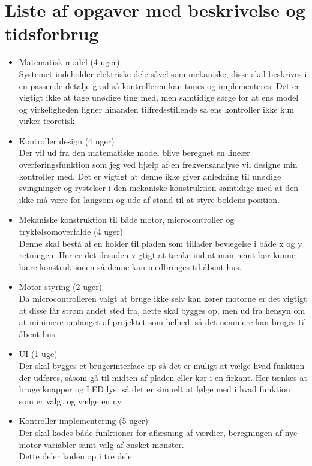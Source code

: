 \section{Liste af opgaver med beskrivelse og tidsforbrug}
\begin{itemize}
\item	Matematisk model (4 uger)
\\	Systemet indeholder elektriske dele såvel som mekaniske, disse skal beskrives i en passende detalje grad så kontrolleren kan tunes og implementeres.
Det er vigtigt ikke at tage unødige ting med, men samtidige sørge for at ens model og virkeligheden ligner hinanden tilfredsstillende så ens kontroller ikke kun virker teoretisk.
\item	Kontroller design (4 uger)
\\	Der vil ud fra den matematiske model blive beregnet en lineær overføringsfunktion som jeg ved hjælp af en frekvensanalyse vil designe min kontroller med. Det er vigtigt at denne ikke giver anledning til unødige svingninger og rystelser i den mekaniske konstruktion samtidige med at den ikke må være for langsom og ude af stand til at styre boldens position.
\item	Mekaniske konstruktion til både motor, microcontroller og trykfølsomoverfalde (4 uger)
\\	Denne skal bestå af en holder til pladen som tillader bevægelse i både x og y retningen. Her er det desuden vigtigt at tænke ind at man nemt bør kunne bære konstruktionen så denne kan medbringes til åbent hus.
\item	Motor styring (2 uger)
\\	Da microcontrolleren valgt at bruge ikke selv kan kører motorne er det vigtigt at disse får strøm andet sted fra, dette skal bygges op, men ud fra hensyn om at minimere omfanget af projektet som helhed, så det nemmere kan bruges til åbent hus.
\item	UI (1 uge)
\\	Der skal bygges et brugerinterface op så det er muligt at vælge hvad funktion der udføres, såsom gå til midten af pladen eller kør i en firkant. Her tænkes at bruge knapper og LED lys, så det er simpelt at følge med i hvad funktion som er valgt og vælge en ny.
\item	Kontroller implementering (5 uger)
\\	Der skal kodes både funktioner for aflæsning af værdier, beregningen af nye motor variabler samt valg af ønsket mønster.
\\	Dette deler koden op i tre dele.

\end{itemize}
